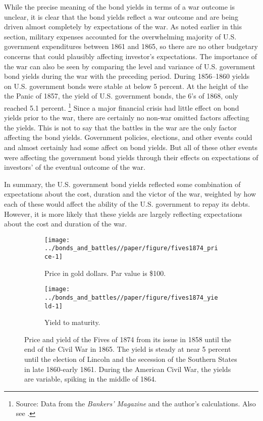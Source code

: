 
While the precise meaning of the bond yields in terms of a war outcome is unclear, it is clear that the bond yields reflect a war outcome and are being driven almost completely by expectations of the war.
As noted earlier in this section, military expenses accounted for the overwhelming majority of U.S. government expenditures between 1861 and 1865, so there are no other budgetary concerns that could plausibly affecting investor's expectations.
The importance of the war can also be seen by comparing the level and variance of U.S. government bond yields during the war with the preceding period.
During 1856--1860 yields on U.S. government bonds were stable at below 5 percent.
At the height of the the Panic of 1857, the yield of U.S. government bonds, the 6's of 1868, only reached 5.1 percent.%
\footnote{Source: Data from the \textit{Bankers' Magazine} and the author's calculations. Also see \textcite{HomerSylla2005}.}
Since a major financial crisis had little effect on bond yields prior to the war, there are certainly no non-war omitted factors affecting the yields.
This is not to say that the battles in the war are the only factor affecting the bond yields.
Government policies, elections, and other events could and almost certainly had some affect on bond yields.
But all of these other events were affecting the government bond yields through their effects on expectations of investors' of the eventual outcome of the war.

In summary, the U.S. government bond yields reflected some combination of expectations about the cost, duration and the victor of the war, weighted by how each of these would affect the ability of the U.S. government to repay its debts.
However, it is more likely that these yields are largely reflecting expectations about the cost and duration of the war.

\begin{figure}[!]
  \centering
  \begin{subfigure}[b]{\linewidth}
   \texttt{[image: ../bonds\_and\_battles//paper/figure/fives1874\_price-1]}
  \caption{Price in gold dollars. Par value is \$100.}
  \label{bonds:fig:fives1874_price}
\end{subfigure}
\begin{subfigure}[b]{\linewidth}
   \texttt{[image: ../bonds\_and\_battles//paper/figure/fives1874\_yield-1]}
  \caption{Yield to maturity.}
  \label{bonds:fig:fives1874_yield}
\end{subfigure}
\caption[Price and yield of the Fives of 1874, 1858-1865]{Price and yield of the Fives of 1874 from its issue in 1858 until the end of the Civil War in 1865.
The yield is steady at near 5 percent until the election of Lincoln and the secession of the Southern States in late 1860-early 1861.
During the American Civil War, the yields are variable, spiking in the middle of 1864.
 }
\label{bonds:fig:fives1874_yield_price}
\end{figure}

